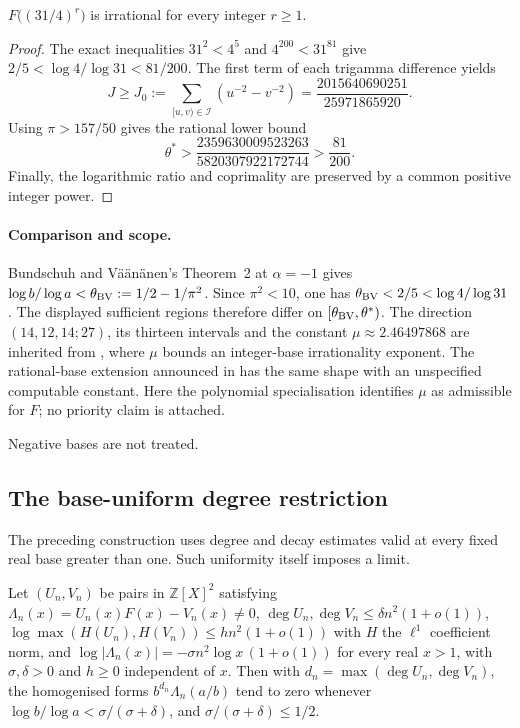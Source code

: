 \documentclass[11pt]{article}
\begin{document}
\begin{corollary}\label{res:thirtyone-four}
$F\bigl((31/4)^r\bigr)$ is irrational for every integer $r\ge1$.
\end{corollary}
\begin{proof}
The exact inequalities $31^2<4^5$ and $4^{200}<31^{81}$ give
$2/5<\log4/\log31<81/200$.
The first term of each trigamma difference yields
\[
 J\ge J_0:=\sum_{[u,v)\in\mathcal I}(u^{-2}-v^{-2})
   =\frac{2015640690251}{25971865920}.
\]
Using $\pi>157/50$ gives the rational lower bound
\[
 \theta^*>\frac{2359630009523263}{5820307922172744}
           >\frac{81}{200}.
\]
Finally, the logarithmic ratio and coprimality are preserved by a common
positive integer power.
\end{proof}

\paragraph{Comparison and scope.}
Bundschuh and V\"a\"an\"anen's Theorem~2 at $\alpha=-1$
\cite[p.~177]{bv1994} gives
$\log b/\log a<\theta_{\rm BV}:=1/2-1/\pi^2$.
Since $\pi^2<10$, one has $\theta_{\rm BV}<2/5<\log4/\log31$.
The displayed sufficient regions therefore differ on
$[\theta_{\rm BV},\theta^*)$.
The direction $(14,12,14;27)$, its thirteen intervals and the constant
$\mu\approx2.46497868$ are inherited from \cite[p.~162]{zudilin2004},
where $\mu$ bounds an integer-base irrationality exponent.
The rational-base extension announced in \cite[Section~2]{zudilin2016}
has the same shape with an unspecified computable constant.
Here the polynomial specialisation identifies $\mu$ as admissible for $F$;
no priority claim is attached.

Negative bases are not treated.

\subsection{The base-uniform degree restriction}
The preceding construction uses degree and decay estimates valid at every
fixed real base greater than one.  Such uniformity itself imposes a limit.

\begin{theorem}
\label{res:archimedean-cap}
Let $(U_n,V_n)$ be pairs in $\mathbb Z[X]^2$ satisfying $\Lambda_n(x)=U_n(x)F(x)-V_n(x)\ne0$,
$\deg U_n,\deg V_n\le\delta n^2(1+o(1))$,
$\log\max(H(U_n),H(V_n))\le h n^2(1+o(1))$ with $H$ the $\ell^1$ coefficient
norm, and
$\log|\Lambda_n(x)|=-\sigma n^2\log x\,(1+o(1))$ for every real $x>1$, with
$\sigma,\delta>0$ and $h\ge0$ independent of $x$.  Then with
$d_n=\max(\deg U_n,\deg V_n)$, the homogenised forms
$b^{d_n}\Lambda_n(a/b)$ tend to zero whenever
$\log b/\log a<\sigma/(\sigma+\delta)$, and $\sigma/(\sigma+\delta)\le1/2$.
\end{theorem}
\end{document}
